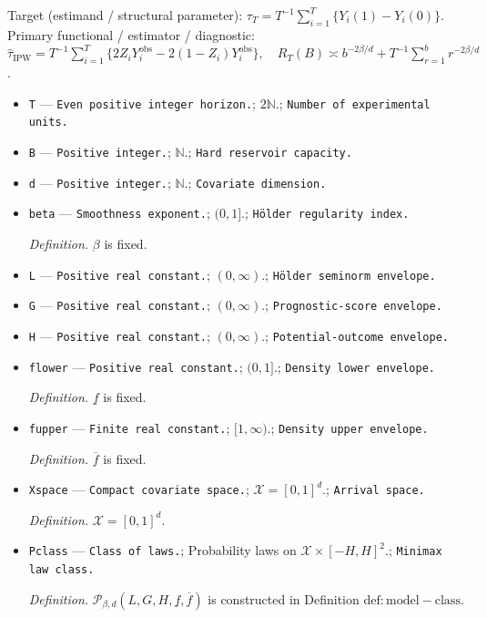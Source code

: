 \documentclass{article}
\begin{document}
Target (estimand / structural parameter): \(\tau_T=T^{-1}\sum_{i=1}^T\{Y_i(1)-Y_i(0)\}\).
Primary functional / estimator / diagnostic: \(\widehat\tau_{\mathrm{IPW}}=T^{-1}\sum_{i=1}^T\{2Z_iY_i^{\mathrm{obs}}-2(1-Z_i)Y_i^{\mathrm{obs}}\},\quad R_T(B)\asymp b^{-2\beta/d}+T^{-1}\sum_{r=1}^{b}r^{-2\beta/d}\).
\begin{itemize}
  \item \texttt{T} --- \texttt{Even positive integer horizon.}; \(2\mathbb N\).; \texttt{Number of experimental units.}
  \item \texttt{B} --- \texttt{Positive integer.}; \(\mathbb N\).; \texttt{Hard reservoir capacity.}
  \item \texttt{d} --- \texttt{Positive integer.}; \(\mathbb N\).; \texttt{Covariate dimension.}
  \item \texttt{beta} --- \texttt{Smoothness exponent.}; \((0,1]\).; \texttt{Hölder regularity index.}
  \par\smallskip\noindent\emph{Definition.} \(\beta\) is fixed.
  \item \texttt{L} --- \texttt{Positive real constant.}; \((0,\infty)\).; \texttt{Hölder seminorm envelope.}
  \item \texttt{G} --- \texttt{Positive real constant.}; \((0,\infty)\).; \texttt{Prognostic-\allowbreak{}score envelope.}
  \item \texttt{H} --- \texttt{Positive real constant.}; \((0,\infty)\).; \texttt{Potential-\allowbreak{}outcome envelope.}
  \item \texttt{flower} --- \texttt{Positive real constant.}; \((0,1]\).; \texttt{Density lower envelope.}
  \par\smallskip\noindent\emph{Definition.} \(\underline f\) is fixed.
  \item \texttt{fupper} --- \texttt{Finite real constant.}; \([1,\infty)\).; \texttt{Density upper envelope.}
  \par\smallskip\noindent\emph{Definition.} \(\overline f\) is fixed.
  \item \texttt{Xspace} --- \texttt{Compact covariate space.}; \(\mathcal X=[0,1]^d\).; \texttt{Arrival space.}
  \par\smallskip\noindent\emph{Definition.} \(\mathcal X=[0,1]^d\).
  \item \texttt{Pclass} --- \texttt{Class of laws.}; Probability laws on \(\mathcal X\times[-H,H]^2\).; \texttt{Minimax law class.}
  \par\smallskip\noindent\emph{Definition.} \(\mathcal P_{\beta,d}(L,G,H,\underline f,\overline f)\) is constructed in Definition \(\mathrm{def:model-class}\).

\end{itemize}
\end{document}
